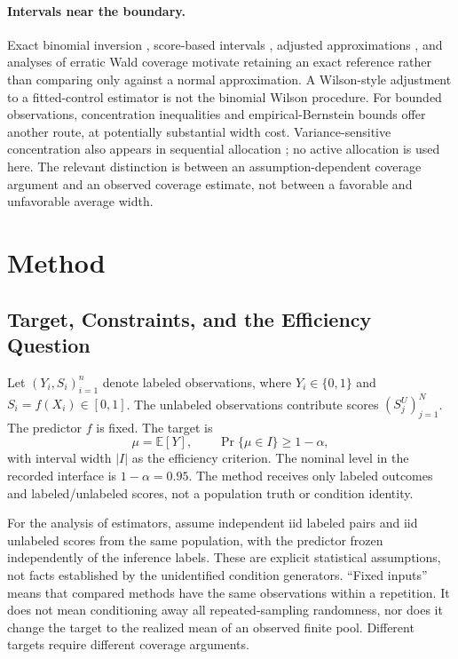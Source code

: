 \documentclass{article}
\newcommand{\E}{\mathbb{E}}
\begin{document}
\paragraph{Intervals near the boundary.}
Exact binomial inversion \citep{BlythStill1983}, score-based intervals \citep{Newcombe1998}, adjusted approximations \citep{AgrestiCoull1998}, and analyses of erratic Wald coverage \citep{BrownCaiDasGupta2001} motivate retaining an exact reference rather than comparing only against a normal approximation. A Wilson-style adjustment to a fitted-control estimator is not the binomial Wilson procedure. For bounded observations, concentration inequalities \citep{Hoeffding1963} and empirical-Bernstein bounds \citep{MaurerPontil2009} offer another route, at potentially substantial width cost. Variance-sensitive concentration also appears in sequential allocation \citep{Audibert2009}; no active allocation is used here. The relevant distinction is between an assumption-dependent coverage argument and an observed coverage estimate, not between a favorable and unfavorable average width.

\section{Method}
\subsection{Target, Constraints, and the Efficiency Question}
Let $(Y_i,S_i)_{i=1}^n$ denote labeled observations, where $Y_i\in\{0,1\}$ and $S_i=f(X_i)\in[0,1]$. The unlabeled observations contribute scores $(S_j^U)_{j=1}^N$. The predictor $f$ is fixed. The target is
\begin{equation}
\mu=\E[Y],\qquad
\Pr\{\mu\in I\}\geq 1-\alpha,
\label{eq:target}
\end{equation}
with interval width $|I|$ as the efficiency criterion. The nominal level in the recorded interface is $1-\alpha=0.95$. The method receives only labeled outcomes and labeled/unlabeled scores, not a population truth or condition identity.

For the analysis of estimators, assume independent iid labeled pairs and iid unlabeled scores from the same population, with the predictor frozen independently of the inference labels. These are explicit statistical assumptions, not facts established by the unidentified condition generators. ``Fixed inputs'' means that compared methods have the same observations within a repetition. It does not mean conditioning away all repeated-sampling randomness, nor does it change the target to the realized mean of an observed finite pool. Different targets require different coverage arguments.
\end{document}
